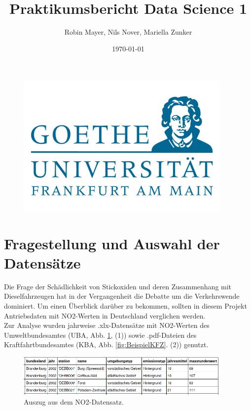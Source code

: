 \documentclass[11pt,a4paper,oneside,german]{article}
\title{Praktikumsbericht Data Science 1}
\author{Robin Mayer, Nils Nover, Mariella Zunker}
\date{\today}
\begin{document}
	\maketitle
	
	\begin{figure}[h]
		\centering
		\includegraphics[width=10.5cm]{uniemblem.jpg}		
	\end{figure}
	
	\newpage
	
	\tableofcontents
	
	\section{Fragestellung und Auswahl der Datensätze}
	
	Die Frage der Schädlichkeit von Stickoxiden und deren Zusammenhang mit Dieselfahrzeugen hat in der Vergangenheit die Debatte um die Verkehrswende dominiert. Um einen Überblick darüber zu bekommen, sollten in diesem Projekt Antriebsdaten mit NO2-Werten in Deutschland verglichen werden. \\
	Zur Analyse wurden jahrweise .xlx-Datensätze mit NO2-Werten des Umweltbundesamtes (UBA, Abb. \ref{fig:BeispielNO2}, (1)) sowie .pdf-Dateien des Kraftfahrtbundesamtes (KBA, Abb. \ref{fig:BeispielKFZ}. (2)) genutzt.
	
	\begin{figure}[h!]
		\centering
		\includegraphics[width=10.5cm]{BeispielNO2.png}
		\caption{Auszug aus dem NO2-Datensatz.}
		\label{fig:BeispielNO2}
	\end{figure}
	
\end{document}

